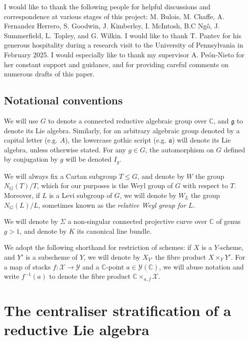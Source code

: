 \documentclass{amsart}
\theoremstyle{remark}
\numberwithin{theorem}{section}
\numberwithin{equation}{section}
\begin{document}
I would like to thank the following people for helpful discussions and correspondence at various stages of this project: M. Bulois, M. Chaffe, A. Fernandez Herrero, S. Goodwin, J. Kimberley, I. McIntosh, B.C Ngô, J. Summerfield, L. Topley, and G. Wilkin. I would like to thank T. Pantev for his generous hospitality during a research visit to the University of Pennsylvania in February 2025. I would especially like to thank my supervisor A. Peón-Nieto for her constant support and guidance, and for providing careful comments on numerous drafts of this paper.


\subsection{Notational conventions}

We will use $G$ to denote a connected reductive algebraic group over $\mathbb{C}$, and $\mathfrak{g}$ to denote its Lie algebra. Similarly, for an arbitrary algebraic group denoted by a capital letter (e.g. $A$), the lowercase gothic script (e.g. $\mathfrak{a}$) will denote its Lie algebra, unless otherwise stated. For any $g \in G$, the automorphism on $G$ defined by conjugation by $g$ will be denoted $I_g$.

We will always fix a Cartan subgroup $T \leq G$, and denote by $W$ the group $N_G(T)/T$, which for our purposes is the Weyl group of $G$ with respect to $T$. Moreover, if $L$ is a Levi subgroup of $G$, we will denote by $W_L$ the group $N_G(L)/L$, sometimes known as the \emph{relative Weyl group for $L$}.

We will denote by $\Sigma$ a non-singular connected projective curve over $\mathbb{C}$ of genus $g > 1$, and denote by $K$ its canonical line bundle. 

We adopt the following shorthand for restriction of schemes: if $X$ is a $Y$-scheme, and $Y'$ is a subscheme of $Y$, we will denote by $X_{Y'}$ the fibre product $X \times_Y Y'$. For a map of stacks $f:\mathcal X \rightarrow \mathcal Y$ and a $\mathbb{C}$-point $a \in \mathcal Y(\mathbb{C})$, we will abuse notation and write $f^{-1}(a)$ to denote the fibre product $\mathbb{C} \times_{a,f}\mathcal X$. 

\section{The centraliser stratification of a reductive Lie algebra}\label{Sheetsscn}
\end{document}
